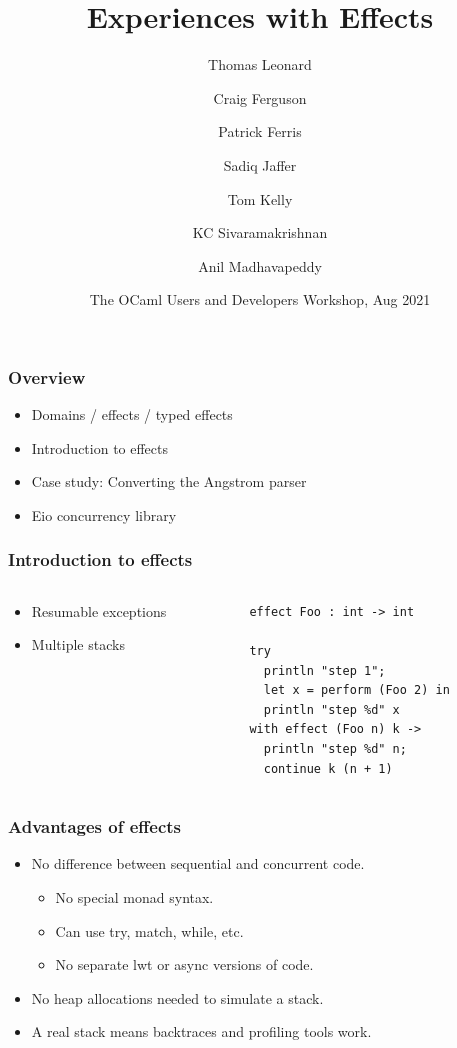 \documentclass{beamer}
\title[Effects]{Experiences with Effects}
\author[Thomas Leonard]
{Thomas Leonard\and Craig Ferguson\and Patrick Ferris\and Sadiq Jaffer\and Tom Kelly\and KC Sivaramakrishnan\and Anil Madhavapeddy}
\institute{OCaml Labs}
\date[OCaml 2021]{The OCaml Users and Developers Workshop, Aug 2021}
\newcommand\mlkeyword[1]{{\ttfamily\color{darkblue} #1}}
\begin{document}

\frame{\titlepage}


\begin{frame}
	\frametitle{Overview}
	\begin{itemize}
		\item {\color{grey}Domains / }effects {\color{grey}/ typed effects}
		\item Introduction to effects
		\item Case study: Converting the Angstrom parser
		\item Eio concurrency library
	\end{itemize}
\end{frame}

\begin{frame}[fragile]
	\frametitle{Introduction to effects}
	\begin{columns}[t]
		\begin{column}{4.5cm}
	\begin{itemize}
		\item Resumable exceptions
		\item Multiple stacks
	\end{itemize}
		\end{column}
		\begin{column}{5cm}
\begin{lstlisting}[style=ocaml]
effect Foo : int -> int

try
  println "step 1";
  let x = perform (Foo 2) in
  println "step %d" x
with effect (Foo n) k ->
  println "step %d" n;
  continue k (n + 1)
\end{lstlisting}
		\end{column}
	\end{columns}
\end{frame}

\begin{frame}
	\frametitle{Advantages of effects}
	\begin{itemize}
		\item No difference between sequential and concurrent code.
			\begin{itemize}
				\item No special monad syntax.
				\item Can use \mlkeyword{try}, \mlkeyword{match}, \mlkeyword{while}, etc.
				\item No separate lwt or async versions of code.
			\end{itemize}
		\item No heap allocations needed to simulate a stack.
		\item A real stack means backtraces and profiling tools work.
	\end{itemize}
\end{frame}
\end{document}
